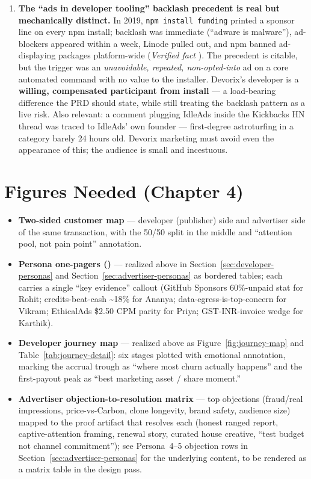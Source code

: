 \begin{enumerate}
\item \textbf{The ``ads in developer tooling'' backlash precedent is real but mechanically distinct.} In 2019, \texttt{npm install funding} printed a sponsor line on every npm install; backlash was immediate (``adware is malware''), ad-blockers appeared within a week, Linode pulled out, and npm banned ad-displaying packages platform-wide (\emph{Verified fact} \cite{npm_funding_infoq_2026,npm_funding_register_2026,npm_funding_hn_2026}). The precedent is citable, but the trigger was an \emph{unavoidable, repeated, non-opted-into} ad on a core automated command with no value to the installer. Devorix's developer is a \textbf{willing, compensated participant from install} --- a load-bearing difference the PRD should state, while still treating the backlash pattern as a live risk. Also relevant: a comment plugging IdleAds inside the Kickbacks HN thread was traced to IdleAds' own founder --- first-degree astroturfing in a category barely 24 hours old. Devorix marketing must avoid even the appearance of this; the audience is small and incestuous.
\end{enumerate}

\section{Figures Needed (Chapter 4)}
\label{sec:ch4-figures}

\begin{itemize}
\item \textbf{Two-sided customer map} --- developer (publisher) side and advertiser side of the same transaction, with the 50/50 split in the middle and ``attention pool, not pain point'' annotation.
\item \textbf{Persona one-pagers ()} --- realized above in Section~\ref{sec:developer-personas} and Section~\ref{sec:advertiser-personas} as bordered tables; each carries a single ``key evidence'' callout (GitHub Sponsors 60\%-unpaid stat for Rohit; credits-beat-cash \textasciitilde18\% for Ananya; data-egress-is-top-concern for Vikram; EthicalAds \$2.50 CPM parity for Priya; GST-INR-invoice wedge for Karthik).
\item \textbf{Developer journey map} --- realized above as Figure~\ref{fig:journey-map} and Table~\ref{tab:journey-detail}: six stages plotted with emotional annotation, marking the accrual trough as ``where most churn actually happens'' and the first-payout peak as ``best marketing asset / share moment.''
\item \textbf{Advertiser objection-to-resolution matrix} --- top objections (fraud/real impressions, price-vs-Carbon, clone longevity, brand safety, audience size) mapped to the proof artifact that resolves each (honest ranged report, captive-attention framing, renewal story, curated house creative, ``test budget not channel commitment''); see Persona~4--5 objection rows in Section~\ref{sec:advertiser-personas} for the underlying content, to be rendered as a matrix table in the design pass.
\end{itemize}
